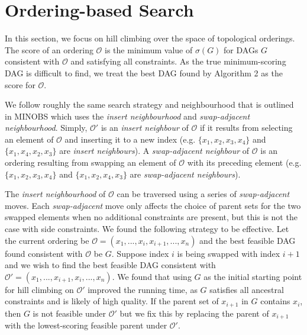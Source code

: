 \documentclass[twoside,11pt]{article}
\begin{document}
\section{Ordering-based Search}

In this section, we focus on hill climbing over the space of topological orderings. The score of an ordering $\mathcal{O}$ is the minimum value of $\sigma(G)$
for DAGs $G$ consistent with $\mathcal{O}$ and satisfying all constraints. As the true minimum-scoring DAG is difficult to find, we treat the best DAG found by
Algorithm 2 as the score for $\mathcal{O}$.

\smallskip
We follow roughly the same search strategy and neighbourhood that is outlined in MINOBS 
\citep{Lee2017} which uses the \emph{insert neighbourhood} and \emph{swap-adjacent neighbourhood}. Simply, $\mathcal{O'}$ is an 
\emph{insert neighbour} of $\mathcal{O}$ if it results from selecting an element of $\mathcal{O}$ and inserting it to a new index (e.g. $\{x_1,x_2,x_3,x_4\}$ and $\{x_1,x_4,x_2,x_3\}$
are \emph{insert neighbours}). A \emph{swap-adjacent neighbour} of $\mathcal{O}$ is an ordering resulting from swapping an element of $\mathcal{O}$ with its preceding element 
(e.g. $\{x_1,x_2,x_3,x_4\}$ and $\{x_1,x_2,x_4,x_3\}$ are \emph{swap-adjacent neighbours}).

\smallskip
The \emph{insert neighbourhood} of $\mathcal{O}$ can be traversed using a series of \emph{swap-adjacent} moves. Each \emph{swap-adjacent} move only affects
the choice of parent sets for the two swapped elements when no additional constraints are present, but this is not the case with side constraints. 
We found the following strategy to be effective. Let the current ordering be $\mathcal{O} = (x_1, ..., x_i, x_{i+1}, ..., x_n)$ and the best feasible DAG found consistent with $\mathcal{O}$ be $G$.
Suppose index $i$ is being swapped with index $i+1$ and we wish to find the best feasible DAG consistent with 
$\mathcal{O}' = (x_1, ..., x_{i+1}, x_i, ... , x_n)$. We found that using $G$ as the initial starting point for hill climbing on $\mathcal{O'}$ improved the running time, as $G$ satisfies all ancestral constraints and is likely of high quality. If the parent set of 
$x_{i+1}$ in $G$ contains $x_i$, then $G$ is not feasible under $\mathcal{O'}$ but we fix this by replacing the parent of $x_{i+1}$ with the lowest-scoring
feasible parent under $\mathcal{O'}$.

%
%
\end{document}
